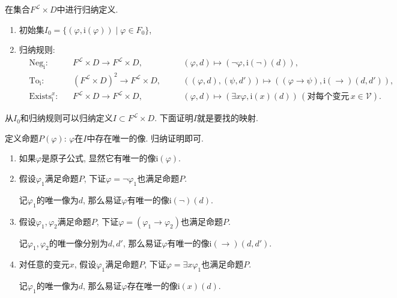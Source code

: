 在集合$F^{\mathcal{L}}\times D$中进行归纳定义.
\begin{enumerate}
    \item 初始集$I_0=\{(\varphi,\mathrm{i}(\varphi))\mid \varphi\in F_0\}$,
    \item 归纳规则:
    \[\begin{aligned}
        &\mathrm{Neg}_{\mathrm{i}}:&&
        F^{\mathcal{L}}\times D\to F^{\mathcal{L}}\times D,\quad&&
        (\varphi,d)\mapsto(\neg\varphi,\mathrm{i}(\neg)(d)),\\[-3pt]
        &\mathrm{To}_{\mathrm{i}}:&&
        (F^{\mathcal{L}}\times D)^2\to F^{\mathcal{L}}\times D,\quad&&
        ((\varphi,d),(\psi,d'))\mapsto((\varphi\to\psi),\mathrm{i}(\to)(d,d')),\\[-3pt]
        &\mathrm{Exists}_{\mathrm{i}}^x:&&
        F^{\mathcal{L}}\times D\to F^{\mathcal{L}}\times D,\quad&&
        (\varphi,d)\mapsto(\exists x\varphi,\mathrm{i}(x)(d))
        \,(\text{对每个变元}\,x\in\mathcal{V}).
    \end{aligned}\]
\end{enumerate}
从$I_0$和归纳规则可以归纳定义$I\subset F^{\mathcal{L}}\times D$.
下面证明$I$就是要找的映射.

定义命题$P(\varphi)$: $\varphi$在$I$中存在唯一的像. 归纳证明即可.

\begin{enumerate}
    \item 如果$\varphi$是原子公式, 显然它有唯一的像$\mathrm{i}(\varphi)$.
    
    \item 假设$\varphi_1$满足命题$P$, 下证$\varphi=\neg\varphi_1$也满足命题$P$.
    
    \hspace{2.17em}
    记$\varphi_1$的唯一像为$d$, 那么易证$\varphi$有唯一的像$\mathrm{i}(\neg)(d)$.

    \item 假设$\varphi_1,\varphi_2$满足命题$P$,
    下证$\varphi=(\varphi_1\to\varphi_2)$也满足命题$P$.

    \hspace{2.17em}
    记$\varphi_1,\varphi_2$的唯一像分别为$d,d'$,
    那么易证$\varphi$有唯一的像$\mathrm{i}(\to)(d,d')$.

    \item 对任意的变元$x$, 假设$\varphi_1$满足命题$P$,
    下证$\varphi=\exists x\varphi_1$也满足命题$P$.

    \hspace{2.17em}
    记$\varphi_1$的唯一像为$d$, 那么易证$\varphi$存在唯一的像$\mathrm{i}(x)(d)$.
\end{enumerate}

